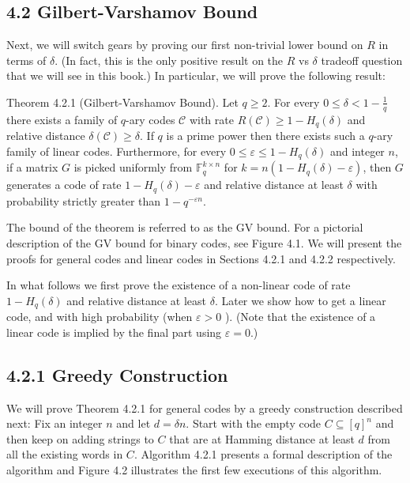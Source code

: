 \documentclass[10pt]{article}
\begin{document}
\subsection*{4.2 Gilbert-Varshamov Bound}
Next, we will switch gears by proving our first non-trivial lower bound on $R$ in terms of $\delta$. (In fact, this is the only positive result on the $R$ vs $\delta$ tradeoff question that we will see in this book.) In particular, we will prove the following result:

Theorem 4.2.1 (Gilbert-Varshamov Bound). Let $q \geq 2$. For every $0 \leq \delta<1-\frac{1}{q}$ there exists a family of $q$-ary codes $\mathscr{C}$ with rate $R(\mathscr{C}) \geq 1-H_{q}(\delta)$ and relative distance $\delta(\mathscr{C}) \geq \delta$. If $q$ is a prime power then there exists such a $q$-ary family of linear codes. Furthermore, for every $0 \leq \varepsilon \leq 1-H_{q}(\delta)$ and integer $n$, if a matrix $G$ is picked uniformly from $\mathbb{F}_{q}^{k \times n}$ for $k=n\left(1-H_{q}(\delta)-\varepsilon\right)$, then $G$ generates a code of rate $1-H_{q}(\delta)-\varepsilon$ and relative distance at least $\delta$ with probability strictly greater than $1-q^{-\varepsilon n}$.

The bound of the theorem is referred to as the GV bound. For a pictorial description of the GV bound for binary codes, see Figure 4.1. We will present the proofs for general codes and linear codes in Sections 4.2.1 and 4.2.2 respectively.

In what follows we first prove the existence of a non-linear code of rate $1-H_{q}(\delta)$ and relative distance at least $\delta$. Later we show how to get a linear code, and with high probability (when $\varepsilon>0$ ). (Note that the existence of a linear code is implied by the final part using $\varepsilon=0$.)

\subsection*{4.2.1 Greedy Construction}
We will prove Theorem 4.2.1 for general codes by a greedy construction described next: Fix an integer $n$ and let $d=\delta n$. Start with the empty code $C \subseteq[q]^{n}$ and then keep on adding strings to $C$ that are at Hamming distance at least $d$ from all the existing words in $C$. Algorithm 4.2.1 presents a formal description of the algorithm and Figure 4.2 illustrates the first few executions of this algorithm.
\end{document}
